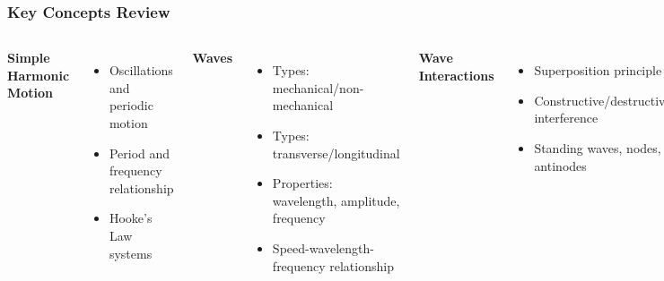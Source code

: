 \documentclass{beamer}
\begin{document}
\begin{frame}
\frametitle{Key Concepts Review}
\begin{columns}
\textbf{Simple Harmonic Motion}
\begin{itemize}
\item Oscillations and periodic motion
\item Period and frequency relationship
\item Hooke's Law systems
\end{itemize}

\textbf{Waves}
\begin{itemize}
\item Types: mechanical/non-mechanical
\item Types: transverse/longitudinal
\item Properties: wavelength, amplitude, frequency
\item Speed-wavelength-frequency relationship
\end{itemize}

\textbf{Wave Interactions}
\begin{itemize}
\item Superposition principle
\item Constructive/destructive interference
\item Standing waves, nodes, antinodes
\end{itemize}

\textbf{Sound}
\begin{itemize}
\item Longitudinal mechanical wave
\item Intensity and sound level
\item Doppler effect
\item Resonance and harmonics
\end{itemize}
\end{columns}
\end{frame}
\end{document}
